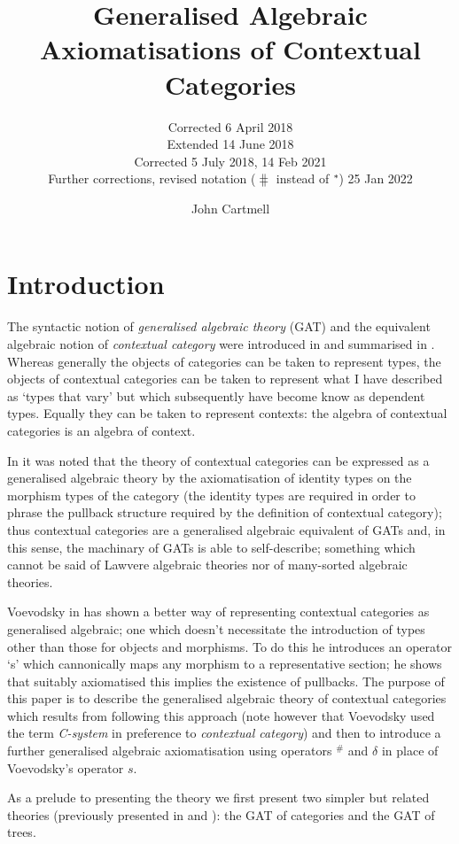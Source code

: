 \documentclass[10pt,a4paper]{scrartcl}
\title{Generalised Algebraic Axiomatisations of Contextual Categories}
\subtitle{Corrected 6 April 2018 \\
          Extended 14 June 2018 \\
					Corrected 5 July 2018, 14 Feb 2021 \\
          Further corrections, revised notation ($\hash$ instead of $^*\kern-1pt$) 25 Jan 2022}
\author{John Cartmell}
\date{}
\newcommand{\hash}{^\#}
\begin{document}
\maketitle


\section{Introduction}
The syntactic notion of \textit{generalised algebraic theory} (GAT) and the  equivalent algebraic notion of \textit{contextual category} were introduced in  \cite{Cartmell78} and summarised in \cite{Cartmell86}. Whereas generally the objects of categories can be taken to represent types, the objects of contextual categories can be taken to represent what I have described as `types that vary' but which subsequently have become know as dependent types. Equally they can be taken to represent contexts: the algebra of contextual categories is an algebra of context. 

In \cite{Cartmell78} it was noted that the theory of contextual categories can be expressed as a generalised algebraic theory by the axiomatisation of identity types on the morphism types of the category 
(the identity types are required in order to phrase the pullback structure required by the definition of contextual category); thus contextual categories are a generalised algebraic equivalent of GATs and, in this sense, the machinary of GATs is able to self-describe; something which cannot be said of Lawvere algebraic theories nor of many-sorted algebraic theories.  

 Voevodsky in \cite{Voevodsky14C} has shown a better way of representing contextual categories as generalised algebraic; one which doesn't necessitate the introduction of types other than those for objects and morphisms. To do this he introduces an operator `s' which cannonically maps any morphism to a representative section; he shows that suitably axiomatised this implies the existence of pullbacks.  The purpose of this paper is to describe the generalised algebraic theory
of contextual categories which results from following this approach (note however that Voevodsky used the term \textit{C-system} in preference to \textit{contextual category}) and then to introduce a further generalised algebraic axiomatisation using operators $\hash$ and $\delta$ in place of Voevodsky's operator $s$.   

As a prelude to presenting the theory we first present two simpler but related theories (previously presented in \cite{Cartmell78} and \cite{Cartmell86}): the GAT of categories and the GAT of trees.
\end{document}
